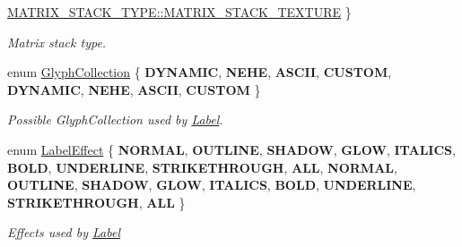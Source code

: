 \begin{DoxyCompactItemize}
\hyperlink{group__base_gga4d146cef7130a8f3a953d46964ea3905a34b60a12b3b0826d198a5f18ef4f48c8}{M\+A\+T\+R\+I\+X\+\_\+\+S\+T\+A\+C\+K\+\_\+\+T\+Y\+P\+E\+::\+M\+A\+T\+R\+I\+X\+\_\+\+S\+T\+A\+C\+K\+\_\+\+T\+E\+X\+T\+U\+RE}
 \}\begin{DoxyCompactList}\small\item\em Matrix stack type. \end{DoxyCompactList}
\item 
enum \hyperlink{group__base_gac5e83e2fc436edc7833f2bcabad984f3}{Glyph\+Collection} \{ \newline
{\bfseries D\+Y\+N\+A\+M\+IC}, 
{\bfseries N\+E\+HE}, 
{\bfseries A\+S\+C\+II}, 
{\bfseries C\+U\+S\+T\+OM}, 
\newline
{\bfseries D\+Y\+N\+A\+M\+IC}, 
{\bfseries N\+E\+HE}, 
{\bfseries A\+S\+C\+II}, 
{\bfseries C\+U\+S\+T\+OM}
 \}\begin{DoxyCompactList}\small\item\em Possible Glyph\+Collection used by \hyperlink{classLabel}{Label}. \end{DoxyCompactList}
\item 
\mbox{\label{group__base_ga26fd049ca5303e0cf4435208058f32e4}} 
enum \hyperlink{group__base_ga26fd049ca5303e0cf4435208058f32e4}{Label\+Effect} \{ \newline
{\bfseries N\+O\+R\+M\+AL}, 
{\bfseries O\+U\+T\+L\+I\+NE}, 
{\bfseries S\+H\+A\+D\+OW}, 
{\bfseries G\+L\+OW}, 
\newline
{\bfseries I\+T\+A\+L\+I\+CS}, 
{\bfseries B\+O\+LD}, 
{\bfseries U\+N\+D\+E\+R\+L\+I\+NE}, 
{\bfseries S\+T\+R\+I\+K\+E\+T\+H\+R\+O\+U\+GH}, 
\newline
{\bfseries A\+LL}, 
{\bfseries N\+O\+R\+M\+AL}, 
{\bfseries O\+U\+T\+L\+I\+NE}, 
{\bfseries S\+H\+A\+D\+OW}, 
\newline
{\bfseries G\+L\+OW}, 
{\bfseries I\+T\+A\+L\+I\+CS}, 
{\bfseries B\+O\+LD}, 
{\bfseries U\+N\+D\+E\+R\+L\+I\+NE}, 
\newline
{\bfseries S\+T\+R\+I\+K\+E\+T\+H\+R\+O\+U\+GH}, 
{\bfseries A\+LL}
 \}\begin{DoxyCompactList}\small\item\em Effects used by {\ttfamily \hyperlink{classLabel}{Label}} \end{DoxyCompactList}
\end{DoxyCompactItemize}
